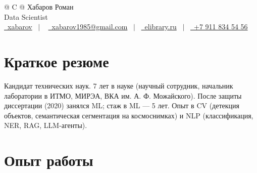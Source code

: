 \documentclass[a4paper,12pt]{article}
\begin{document}
\pagestyle{empty} 



\begin{tabularx}{\linewidth}{@{} C @{}}
\Huge{Хабаров Роман} \\[7.5pt]
\Large{Data Scientist} \\[2.5pt]
\href{https://github.com/xabarov}{\raisebox{-0.05\height}\faGithub\ xabarov} \ $|$ \ 
\href{mailto:xabarov1985@gmail.com}{\raisebox{-0.05\height}\faEnvelope \ xabarov1985@gmail.com} \ $|$ \ 
\href{https://elibrary.ru/author_items.asp?authorid=1045982}{\raisebox{-0.05\height}\faFile\ elibrary.ru} \ $|$ \ 
\href{tel:+79118345456}{\raisebox{-0.05\height}\faMobile \ +7 911 834 54 56} \\
\end{tabularx}


\section{Краткое резюме}
Кандидат технических наук. 7 лет в науке (научный сотрудник, начальник лаборатории в ИТМО, МИРЭА, ВКА им. А. Ф. Можайского). После защиты диссертации (2020) занялся ML; стаж в ML — 5 лет. Опыт в CV (детекция объектов, семантическая сегментация на космоснимках) и NLP (классификация, NER, RAG, LLM-агенты). 

\section{Опыт работы}
\end{document}
